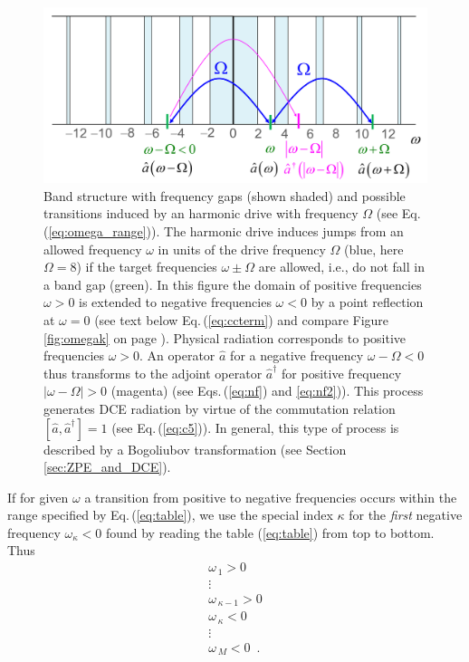 \begin{figure}
    \includegraphics[width=1.0\textwidth, keepaspectratio]{figures/system/jump.png}
    \caption{Band structure with frequency gaps (shown shaded) and possible transitions induced by an harmonic drive with 
    frequency $\Omega$ (see Eq.\,(\ref{eq:omega_range})). 
    The harmonic drive induces jumps from an allowed frequency $\omega$ in units of the drive frequency $\Omega$ (blue, 
    here $\Omega=8$)
    if the target frequencies $\omega \pm \Omega$ are allowed, i.e., do not fall in a band gap (green). 
    In this figure the domain of positive frequencies $\omega>0$
    is extended to negative frequencies $\omega<0$ by a point reflection at $\omega=0$
    (see text below Eq.\,(\ref{eq:ccterm}) and compare Figure\,\ref{fig:omegak} on page \pageref{fig:omegak}). 
    Physical radiation corresponds to positive frequencies $\omega > 0$. An operator $\hat{a}$ for a 
    negative frequency $\omega - \Omega < 0$ thus transforms to the adjoint operator $\hat{a}^{\dagger}$ 
    for positive frequency $|\omega - \Omega| > 0$ (magenta) (see Eqs.\,(\ref{eq:nf}) and \ref{eq:nf2})). 
    This process generates DCE radiation by virtue of the commutation relation 
    $\left[ \hat{a}, \hat{a}^{\dagger} \right] = 1$ (see Eq.\,(\ref{eq:c5})).  
    In general, this type of process is described by a Bogoliubov transformation 
    (see Section \ref{sec:ZPE_and_DCE}).} 
    \label{fig:jump}
\end{figure}

If for given $\omega$ a transition from positive to negative frequencies occurs within the range specified by Eq.\,(\ref{eq:table}), we use the special index $\kappa$ for the {\em first} negative frequency $\omega_{\kappa}<0$ found by reading the table (\ref{eq:table}) from top to bottom. 
Thus
%
\begin{equation} \label{eq:table_kappa}
\begin{array}{l}
\omega_{\,1} > 0 \\
\vdots \\
\omega_{\,\kappa-1} > 0 \\
\omega_{\,\kappa} < 0 \\
\vdots \\
\omega_{\,M} < 0 \, \, \, .
\end{array}
\end{equation}

